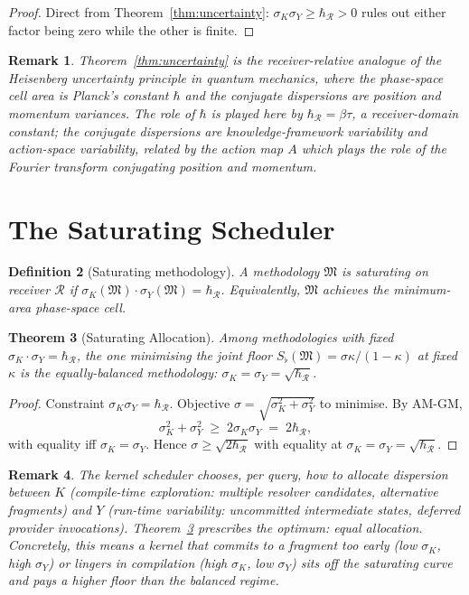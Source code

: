 \documentclass[twocolumn,11pt,a4paper]{article}
\newtheorem{theorem}{Theorem}[section]
\newtheorem{definition}[theorem]{Definition}
\newtheorem{remark}[theorem]{Remark}
\newcommand{\Method}{\mathfrak{M}}
\newcommand{\receiver}{\mathcal{R}}
\newcommand{\Sfloor}{S_{\flat}}
\newcommand{\hbarR}{\hbar_{\receiver}}
\newcommand{\catpow}{\kappa}
\newcommand{\disp}{\sigma}
\begin{document}
\begin{proof}
Direct from Theorem~\ref{thm:uncertainty}: $\disp_K \disp_Y \geq \hbarR > 0$ rules out either factor being zero while the other is finite.
\end{proof}

\begin{remark}
\label{rem:heisenberg-form}
Theorem~\ref{thm:uncertainty} is the receiver-relative analogue of the Heisenberg uncertainty principle in quantum mechanics, where the phase-space cell area is Planck's constant $\hbar$ and the conjugate dispersions are position and momentum variances. The role of $\hbar$ is played here by $\hbarR = \beta \tau$, a receiver-domain constant; the conjugate dispersions are knowledge-framework variability and action-space variability, related by the action map $A$ which plays the role of the Fourier transform conjugating position and momentum.
\end{remark}

\section{The Saturating Scheduler}
\label{sec:scheduler}

\begin{definition}[Saturating methodology]
\label{def:saturating}
A methodology $\Method$ is \emph{saturating} on receiver $\receiver$ if $\disp_K(\Method) \cdot \disp_Y(\Method) = \hbarR$. Equivalently, $\Method$ achieves the minimum-area phase-space cell.
\end{definition}

\begin{theorem}[Saturating Allocation]
\label{thm:saturating-alloc}
Among methodologies with fixed $\disp_K \cdot \disp_Y = \hbarR$, the one minimising the joint floor $\Sfloor(\Method) = \disp \catpow/(1-\catpow)$ at fixed $\catpow$ is the equally-balanced methodology: $\disp_K = \disp_Y = \sqrt{\hbarR}$.
\end{theorem}

\begin{proof}
Constraint $\disp_K \disp_Y = \hbarR$. Objective $\disp = \sqrt{\disp_K^2 + \disp_Y^2}$ to minimise. By AM-GM,
\[
\disp_K^2 + \disp_Y^2 \;\geq\; 2 \disp_K \disp_Y \;=\; 2 \hbarR,
\]
with equality iff $\disp_K = \disp_Y$. Hence $\disp \geq \sqrt{2 \hbarR}$ with equality at $\disp_K = \disp_Y = \sqrt{\hbarR}$.
\end{proof}

\begin{remark}
\label{rem:scheduler-implication}
The kernel scheduler chooses, per query, how to allocate dispersion between $K$ (compile-time exploration: multiple resolver candidates, alternative fragments) and $Y$ (run-time variability: uncommitted intermediate states, deferred provider invocations). Theorem~\ref{thm:saturating-alloc} prescribes the optimum: equal allocation. Concretely, this means a kernel that commits to a fragment too early (low $\disp_K$, high $\disp_Y$) or lingers in compilation (high $\disp_K$, low $\disp_Y$) sits off the saturating curve and pays a higher floor than the balanced regime.
\end{remark}
\end{document}
